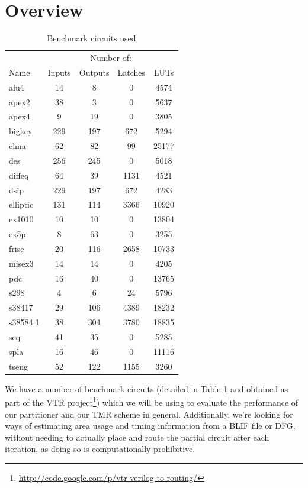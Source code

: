 \documentclass[12pt,final,oneside]{dwThesis} %
\begin{document}
\section{Overview}
\begin{table}
    \begin{center}
        \begin{tabular}{lcccc}
        \toprule
         & \multicolumn{4}{c}{Number of:}\\
         \cmidrule{2-5}
         Name & Inputs & Outputs & Latches & \acp{LUT}\\
         \midrule
            alu4 & 14 & 8 & 0 & 4574\\
            apex2 & 38 & 3 & 0 & 5637\\
            apex4 & 9 & 19 & 0 & 3805\\
            bigkey & 229 & 197 & 672 & 5294\\
            clma & 62 & 82 & 99 & 25177\\
            des & 256 & 245 & 0 & 5018\\
            diffeq & 64 & 39 & 1131 & 4521\\
            dsip & 229 & 197 & 672 & 4283\\
            elliptic & 131 & 114 & 3366 & 10920\\
            ex1010 & 10 & 10 & 0 & 13804\\
            ex5p & 8 & 63 & 0 & 3255\\
            frisc & 20 & 116 & 2658 & 10733\\
            misex3 & 14 & 14 & 0 & 4205\\
            pdc & 16 & 40 & 0 & 13765\\
            s298     & 4 & 6 & 24 & 5796\\
            s38417   & 29 & 106 & 4389 & 18232\\
            s38584.1 & 38 & 304 & 3780 & 18835\\
            seq      & 41 & 35 & 0 & 5285\\
            spla     & 16 & 46 & 0 & 11116\\
            tseng    & 52 & 122 & 1155 & 3260\\
            \bottomrule
        \end{tabular}
        \caption{Benchmark circuits used}
        \label{benchmarkList}
    \end{center}
\end{table}

We have a number of benchmark circuits (detailed in Table \ref{benchmarkList} and obtained as part of the \ac{VTR} project\footnote{\url{http://code.google.com/p/vtr-verilog-to-routing/}}) which we will be using to evaluate the performance of our partitioner and our \ac{TMR} scheme in general.
Additionally, we're looking for ways of estimating area usage and timing information from a \ac{BLIF} file or \ac{DFG}, without needing to actually place and route the partial circuit after each iteration, as doing so is computationally prohibitive.
\end{document}
